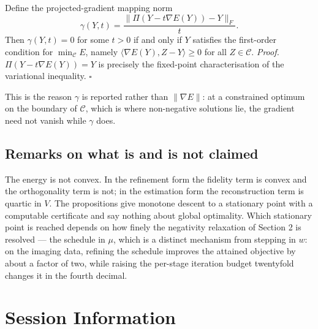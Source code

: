 \documentclass[
]{article}
\begin{document}
Define the projected-gradient mapping norm
\[
\gamma(Y, t) = \frac{\|\Pi(Y - t\nabla E(Y)) - Y\|_F}{t}.
\]
Then \(\gamma(Y,t) = 0\) for some \(t > 0\) if and only if \(Y\) satisfies the first-order condition for \(\min_{\mathcal{C}} E\), namely \(\langle \nabla E(Y), Z - Y\rangle \ge 0\) for all \(Z \in \mathcal{C}\). \emph{Proof.} \(\Pi(Y - t\nabla E(Y)) = Y\) is precisely the fixed-point characterisation of the variational inequality. \(\square\)

This is the reason \(\gamma\) is reported rather than \(\|\nabla E\|\): at a constrained optimum on the boundary of \(\mathcal{C}\), which is where non-negative solutions lie, the gradient need not vanish while \(\gamma\) does.

\subsection{Remarks on what is and is not claimed}\label{remarks-on-what-is-and-is-not-claimed}

The energy is not convex. In the refinement form the fidelity term is convex and the orthogonality term is not; in the estimation form the reconstruction term is quartic in \(V\). The propositions give monotone descent to a stationary point with a computable certificate and say nothing about global optimality. Which stationary point is reached depends on how finely the negativity relaxation of Section 2 is resolved --- the schedule in \(\mu\), which is a distinct mechanism from stepping in \(w\): on the imaging data, refining the schedule improves the attained objective by about a factor of two, while raising the per-stage iteration budget twentyfold changes it in the fourth decimal.

\section{Session Information}\label{session-information}
\end{document}
